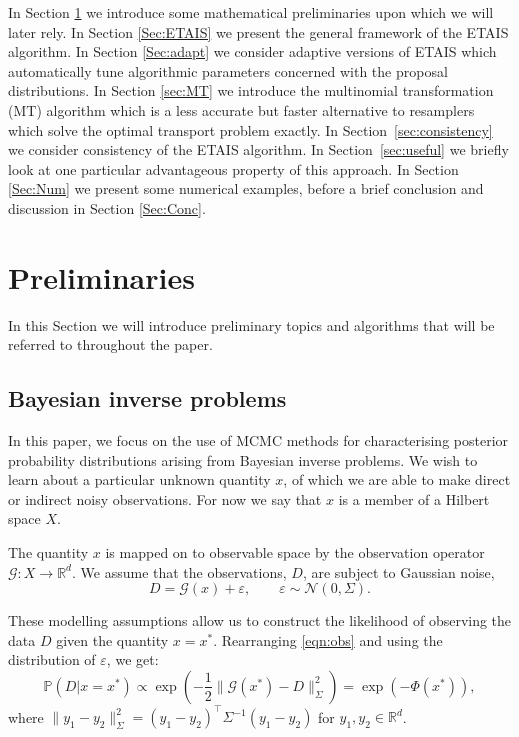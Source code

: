 \documentclass[final]{siamltex}
\newcommand{\data}{D}
\newcommand{\revised}{}
\begin{document}
In Section \ref{Sec:Prelim} we introduce some mathematical
preliminaries upon which we will later rely. In Section \ref{Sec:ETAIS}
we present the general framework of the ETAIS algorithm. In Section
\ref{Sec:adapt} we consider adaptive versions of ETAIS which
automatically tune algorithmic parameters concerned with the proposal
distributions. In Section \ref{sec:MT} we introduce the {\revised multinomial transformation (MT)} algorithm which is a less accurate but
faster alternative to resamplers which solve the optimal transport
problem exactly. In Section~\ref{sec:consistency} we consider
consistency of the ETAIS algorithm. {\revised In Section~\ref{sec:useful} we briefly look at one
particular advantageous property of this approach.} In Section \ref{Sec:Num} we present
some numerical examples, before a brief conclusion and discussion in
Section \ref{Sec:Conc}.


\section{Preliminaries}\label{Sec:Prelim}

In this Section we will introduce preliminary topics and algorithms
that will be referred to throughout the paper.


\subsection{Bayesian inverse problems}
In this paper, we focus on the use of MCMC methods for characterising
posterior probability distributions arising from Bayesian inverse problems. We
wish to learn about a particular unknown quantity $x$, of which we are
able to make direct or indirect noisy observations. For now
we say that $x$ is a member of a Hilbert
space $X$. 

The quantity $x$ is mapped on to observable space by the observation
operator $\mathcal{G}:X \to\mathbb{R}^d$. We assume that the
observations, $\data$, are subject to Gaussian noise,
\begin{equation}\label{eqn:obs}
	\data = \mathcal{G}(x) + \varepsilon, \qquad \varepsilon \sim \mathcal{N}(0,\Sigma).
\end{equation}

These modelling assumptions allow us to construct the 
likelihood of observing the data $\data$ given the quantity $x =
x^*$. Rearranging \eqref{eqn:obs} and using the distribution of
$\varepsilon$, we get:
\begin{equation}\label{eqn:like}
	\mathbb{P}(\data|x=x^*) \propto \exp \left ( -\frac{1}{2} \|\mathcal{G}(x^*)
	  - \data\|_\Sigma^2 \right ) = \exp\left(-\Phi(x^*)\right),
\end{equation}
where $\| y_1 - y_2 \|^2_\Sigma = (y_1-y_2)^\top\Sigma^{-1}(y_1-y_2)$
for $y_1,y_2 \in \mathbb{R}^d$.
\end{document}
